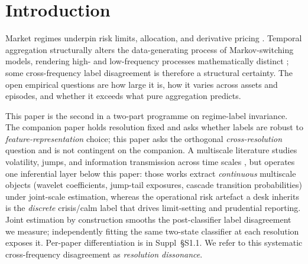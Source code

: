 \documentclass[preprint,12pt,authoryear]{elsarticle}
\begin{document}
\section{Introduction}

Market regimes underpin risk limits, allocation, and derivative pricing \citep{Hamilton1989,AngTimmermann2012,Kim2025MarkovRegime}. Temporal aggregation structurally alters the data-generating process of Markov-switching models, rendering high- and low-frequency processes mathematically distinct \citep{ChanZhangCheung2009}; some cross-frequency label disagreement is therefore a structural certainty. The open empirical questions are how large it is, how it varies across assets and episodes, and whether it exceeds what pure aggregation predicts.

This paper is the second in a two-part programme on regime-label invariance. The companion paper \citep{companion_rep} holds resolution fixed and asks whether labels are robust to \emph{feature-representation} choice; this paper asks the orthogonal \emph{cross-resolution} question and is not contingent on the companion. A multiscale literature studies volatility, jumps, and information transmission across time scales \citep{GencaySelcukGradojevicWhitcher2010,ErdemliogluGradojevic2021,GradojevicTsiakas2021}, but operates one inferential layer below this paper: those works extract \emph{continuous} multiscale objects (wavelet coefficients, jump-tail exposures, cascade transition probabilities) under joint-scale estimation, whereas the operational risk artefact a desk inherits is the \emph{discrete} crisis/calm label that drives limit-setting and prudential reporting. Joint estimation by construction smooths the post-classifier label disagreement we measure; independently fitting the same two-state classifier at each resolution exposes it. Per-paper differentiation is in Suppl~\S{}S1.1. We refer to this systematic cross-frequency disagreement as \emph{resolution dissonance}.
\end{document}
